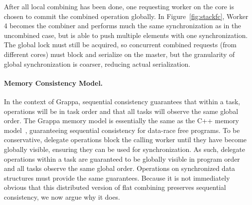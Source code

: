 After all local combining has been done, one requesting worker on the core is chosen to commit the combined operation globally. In Figure~\ref{fig:stackfc}, Worker 4 becomes the combiner and performs much the same synchronization as in the uncombined case, but is able to push multiple elements with one synchronization. The global lock must still be acquired, so concurrent combined requests (from different cores) must block and serialize on the master, but the granularity of global synchronization is coarser, reducing actual serialization.

\paragraph{Memory Consistency Model.}
\label{sec:memory-model}
In the context of Grappa, sequential consistency guarantees that within a
task, operations will be in task order and that all tasks will observe the
same global order.
The Grappa memory model is essentially the same as the C++ memory
model~\cite{boehm:drf0,N2480,N2800}, guaranteeing sequential
consistency for data-race free programs. To be conservative, delegate
operations block the calling worker until they have become globally visible,
ensuring they can be used for synchronization. As such, delegate operations
within a task are guaranteed to be globally visible in program order and all
tasks observe the same global order.
Operations on synchronized data structures must provide the same guarantees.
Because it is not immediately obvious
that this distributed version of flat combining preserves sequential
consistency, we now argue why it does.

